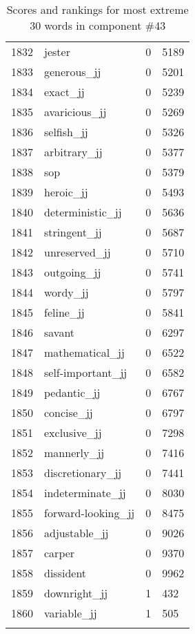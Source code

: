 \begin{longtable}[!htbp]{| rlr@{.}l |}
    1832 & jester & 0 & 5189 \\
    1833 & generous\_jj & 0 & 5201 \\
    1834 & exact\_jj & 0 & 5239 \\
    1835 & avaricious\_jj & 0 & 5269 \\
    1836 & selfish\_jj & 0 & 5326 \\
    1837 & arbitrary\_jj & 0 & 5377 \\
    1838 & sop & 0 & 5379 \\
    1839 & heroic\_jj & 0 & 5493 \\
    1840 & deterministic\_jj & 0 & 5636 \\
    1841 & stringent\_jj & 0 & 5687 \\
    1842 & unreserved\_jj & 0 & 5710 \\
    1843 & outgoing\_jj & 0 & 5741 \\
    1844 & wordy\_jj & 0 & 5797 \\
    1845 & feline\_jj & 0 & 5841 \\
    1846 & savant & 0 & 6297 \\
    1847 & mathematical\_jj & 0 & 6522 \\
    1848 & self-important\_jj & 0 & 6582 \\
    1849 & pedantic\_jj & 0 & 6767 \\
    1850 & concise\_jj & 0 & 6797 \\
    1851 & exclusive\_jj & 0 & 7298 \\
    1852 & mannerly\_jj & 0 & 7416 \\
    1853 & discretionary\_jj & 0 & 7441 \\
    1854 & indeterminate\_jj & 0 & 8030 \\
    1855 & forward-looking\_jj & 0 & 8475 \\
    1856 & adjustable\_jj & 0 & 9026 \\
    1857 & carper & 0 & 9370 \\
    1858 & dissident & 0 & 9962 \\
    1859 & downright\_jj & 1 & 432 \\
    1860 & variable\_jj & 1 & 505 \\
    \hline
    \caption{Scores and rankings for most extreme 30 words in component \#43} \\
\end{longtable}
